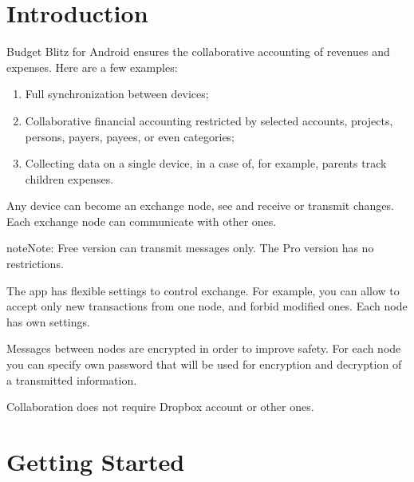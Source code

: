 \documentclass[a4paper,10pt,english]{sphinxmanual}
\begin{document}
\section{Introduction}
\label{\detokenize{teamwork:introduction}}
\sphinxAtStartPar
Budget Blitz for Android ensures the collaborative accounting of revenues and expenses. Here are a few examples:
\begin{enumerate}
%
\item {} 
\sphinxAtStartPar
Full synchronization between devices;

\item {} 
\sphinxAtStartPar
Collaborative financial accounting restricted by selected accounts, projects, persons, payers, payees, or even categories;

\item {} 
\sphinxAtStartPar
Collecting data on a single device, in a case of, for example, parents track children expenses.

\end{enumerate}

\sphinxAtStartPar
Any device can become an exchange node, see {\hyperref[\detokenize{glossary:term-exchange-node}]{}} and receive or transmit changes.
Each exchange node can communicate with other ones.

\begin{sphinxadmonition}{note}{Note:}
\sphinxAtStartPar
Free version can transmit messages only. The Pro version has no restrictions.
\end{sphinxadmonition}

\sphinxAtStartPar
The app has flexible settings to control exchange. For example, you can allow to accept only new transactions
from one node, and forbid modified ones. Each node has own settings.

\sphinxAtStartPar
Messages between nodes are encrypted in order to improve safety. For each node you can specify
own password that will be used for encryption and decryption of a transmitted information.

\sphinxAtStartPar
Collaboration does not require Dropbox account or other ones.


\section{Getting Started}
\label{\detokenize{teamwork:getting-started}}
\end{document}
